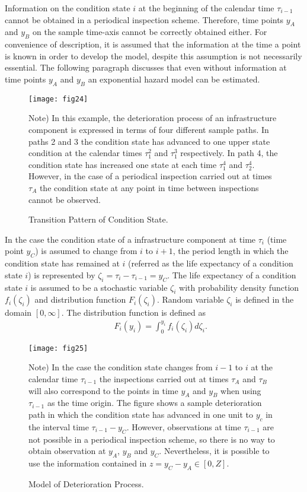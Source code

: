 Information on the condition state $i$ at the beginning of the calendar time $\tau_{i-1}$ cannot be obtained in a periodical inspection scheme. Therefore, time points $y_A$ and $y_B$ on the sample time-axis cannot be correctly obtained either. For convenience of description, it is assumed that the information at the time a point is known in order to develop the model, despite this assumption is not necessarily essential. The following paragraph discusses that even without information at time points $y_A$ and $y_B$ an exponential hazard model can be estimated.
\begin{figure}[t]
\begin{center}
\texttt{[image: fig24]} 
\end{center}
\footnotesize Note) In this example, the deterioration process of an infrastructure component is expressed in terms of four different sample paths. In paths 2 and 3 the condition state has advanced to one upper state condition at the calendar times $\tau_1^2$ and $\tau_1^3$ respectively. In path 4, the condition state has increased one state at each time $\tau_1^4$ and $\tau_{2}^4$. However, in the case of a periodical inspection carried out at times $\tau_A$ the condition state at any point in time between inspections cannot be observed.
\caption{Transition Pattern of Condition State.}
\label{fig24} 
\end{figure}

In the case the condition state of a infrastructure component at time $\tau_{i}$ (time point $y_C$) is assumed to change from $i$ to $i+1$, the period length in which the condition state has remained at $i$ (referred as the life expectancy of a condition state $i$) is represented by $\zeta_i=\tau_{i}-\tau_{i-1}=y_C$. The life expectancy of a condition state $i$ is assumed to be a stochastic variable $\zeta_i$ with probability density function $f_i(\zeta_i)$ and distribution function $F_i(\zeta_i)$. Random variable $\zeta_i$ is defined in the domain $[0,\infty]$. The distribution function is defined as
\begin{eqnarray}
&& F_i(y_i)=\int_0^{y_i}f_i(\zeta_i)d\zeta_i. \label{func21}
\end{eqnarray}
\begin{figure}[t]
\begin{center}
\texttt{[image: fig25]} 
\end{center}
\footnotesize Note) In the case the condition state changes from $i-1$ to $i$ at the calendar time $\tau_{i-1}$ the inspections carried out at times $\tau_A$ and $\tau_B$ will also correspond to the points in time $y_A$ and $y_B$ when using $\tau_{i-1}$ as the time origin. The figure shows a sample deterioration path in which the condition state has advanced in one unit to $y_c$ in the interval time $\tau_{i-1}-y_C$. However, observations at time $\tau_{i-1}$ are not possible in a periodical inspection scheme, so there is no way to obtain observation at $y_A$, $y_B$ and $y_C$. Nevertheless, it is possible to use the information contained in $z=y_C-y_A \in [0,Z]$.
\caption{Model of Deterioration Process.}
\label{fig25} 
\end{figure}

